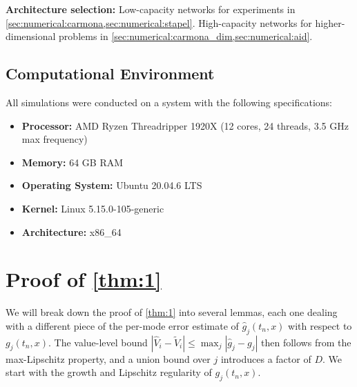 \documentclass[11pt,reqno,a4paper]{amsart}
\theoremstyle{definition}
\numberwithin{equation}{section}
\DeclareMathOperator{\1}{\mathbbm{1}}
\begin{document}
\textbf{Architecture selection:} Low-capacity networks for experiments in \cref{sec:numerical:carmona,sec:numerical:stapel}. High-capacity networks for higher-dimensional problems in \cref{sec:numerical:carmona_dim,sec:numerical:aid}.

\subsection{Computational Environment}
All simulations were conducted on a system with the following specifications:
\begin{itemize}
  \item \textbf{Processor:} AMD Ryzen Threadripper 1920X (12 cores, 24 threads, 3.5 GHz max frequency)
  \item \textbf{Memory:} 64 GB RAM
  \item \textbf{Operating System:} Ubuntu 20.04.6 LTS
  \item \textbf{Kernel:} Linux 5.15.0-105-generic
  \item \textbf{Architecture:} x86\_64
\end{itemize}


\section{Proof of \cref{thm:1}} \label{app:1}

We will break down the proof of \cref{thm:1} into several lemmas, each one dealing with a different piece of the per-mode error estimate of $\widehat{g}_j(t_n,x)$ with respect to $g_j(t_n,x)$. The value-level bound $|\widehat{V}_i - \widetilde{V}_i| \leq \max_j|\widehat{g}_j - g_j|$ then follows from the max-Lipschitz property, and a union bound over $j$ introduces a factor of $D$. We start with the growth and Lipschitz regularity of $g_j(t_n,x)$.
\end{document}
